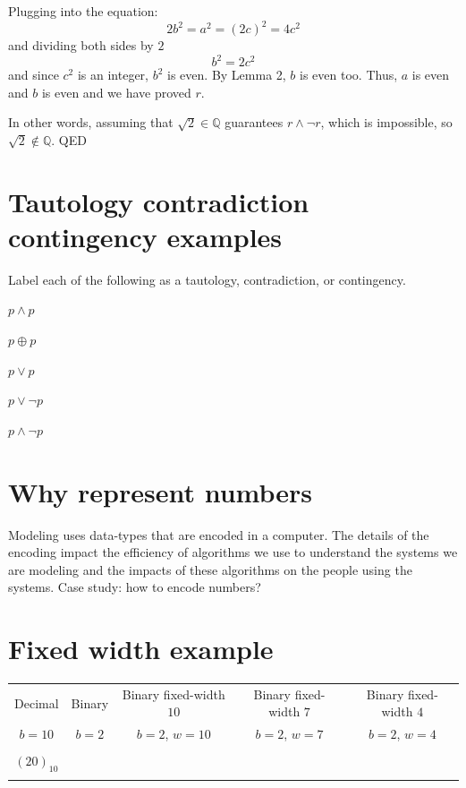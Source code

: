 \documentclass[12pt, oneside]{article}
\begin{document}
Plugging into the equation:
\[
    2b^2 = a^2 = (2c)^2 = 4c^2
\]
and dividing both sides by $2$
\[
    b^2 = 2c^2
\]
and since $c^2$ is an integer, $b^2$ is even. By Lemma 2, $b$ is even too.
Thus, $a$ is even and $b$ is even and we have proved $r$. 

In other words, assuming that $\sqrt{2} \in \mathbb{Q}$ guarantees $r \land \lnot r$, 
which is impossible, so $\sqrt{2} \notin \mathbb{Q}$. QED

 \vfill
\section*{Tautology contradiction contingency examples}


Label each of the following as a tautology, contradiction, or contingency.

$p \land p$

\vfill

$p \oplus p$

\vfill

$p \lor p$

\vfill

$p \lor \lnot p$

\vfill

$p \land \lnot p$

\vfill

 \vfill
\section*{Why represent numbers}


Modeling uses data-types that are encoded in a computer.
The details of the encoding impact the efficiency of algorithms
we use to understand the systems we are modeling and the 
impacts of these algorithms on the people using the systems.
Case study: how to encode numbers?

\vfill \vfill
\section*{Fixed width example}


\begin{center}
    \begin{tabular}{|c|c|c|c|c|}
    \hline
    Decimal &  Binary  & Binary fixed-width $10$& Binary fixed-width $7$ & Binary fixed-width $4$\\
    $b=10$ & $b=2$ & $b=2$, $w =  10$& $b=2$, $w =  7$& $b=2$, $w =  4$ \\
    \hline 
    &&&&  \\
    $(20)_{10}$&\phantom{$(10100)_{2}$\qquad\qquad}&&  &\\
    &&&&  \\
\hline
    \end{tabular}
    \end{center}
 \vfill
\end{document}
